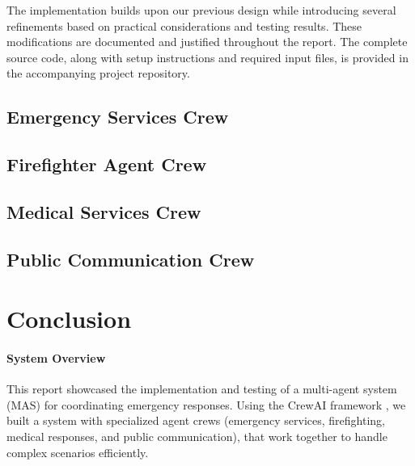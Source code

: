 \documentclass[a4paper]{article}
\begin{document}
The implementation builds upon our previous design while introducing several refinements based on practical considerations and testing results. These modifications are documented and justified throughout the report. The complete source code, along with setup instructions and required input files, is provided in the accompanying project repository.







\subsection{Emergency Services Crew}



\subsection{Firefighter Agent Crew}



\subsection{Medical Services Crew}



\subsection{Public Communication Crew}







\section{Conclusion}
\label{sec:conclusion}

\paragraph{System Overview}
This report showcased the implementation and testing of a multi-agent system (MAS) for coordinating emergency responses. 
Using the CrewAI framework \cite{crewai}, we built a system with specialized agent crews (emergency services, firefighting, medical responses, and public communication), that work together to handle complex scenarios efficiently.
\end{document}
